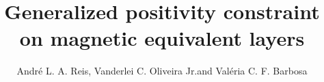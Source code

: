 \documentclass[manuscript,blind]{geophysics}
\begin{document}
\title{Generalized positivity constraint on magnetic equivalent layers}

\renewcommand{\thefootnote}{\fnsymbol{footnote}} 


\address{
\footnotemark[2] Observat\'orio Nacional, Rio de Janeiro, Brazil\\
\footnotemark[1] Corresponding author: reisandreluis@gmail.com}
\author{Andr\'e L. A. Reis\footnotemark[2] \footnotemark[1], Vanderlei C. Oliveira Jr.\footnotemark[2] and  Val\'eria C. F. Barbosa \footnotemark[2]}


\maketitle













\newpage



\clearpage


\end{document}
